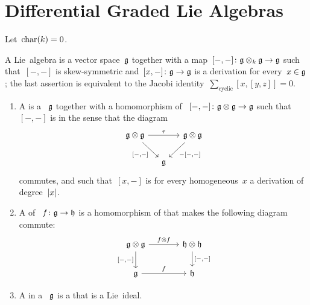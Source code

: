 \documentclass[a4paper,10pt,headings=standardclasses]{scrartcl}
\begin{document}
\section{Differential Graded Lie Algebras}

Let~$\operatorname{char}(k) = 0$.

\begin{recall}
  A Lie~algebra is a vector space~$\mathfrak{g}$ together with a map~$[-,-] \colon \mathfrak{g} \otimes_k \mathfrak{g} \to \mathfrak{g}$ such that~$[-,-]$ is skew-symmetric and~$[x,-] \colon \mathfrak{g} \to \mathfrak{g}$ is a derivation for every~$x \in \mathfrak{g}$;
  the last assertion is equivalent to the Jacobi identity~$\sum_{\text{cyclic}} [x,[y,z]] = 0$.
\end{recall}

\begin{definition}
  \leavevmode
  \begin{enumerate}
    \item
      A  is a {\dgv}~$\mathfrak{g}$ together with a homomorphism of {\dgvs}~$[-,-] \colon \mathfrak{g} \otimes \mathfrak{g} \to \mathfrak{g}$ such that~$[-,-]$ is  in the sense that the diagram
      \[
        \begin{tikzcd}[column sep = small]
          \glie \tensor \glie
          \arrow{rr}[above]{\tau}
          \arrow{dr}[below left]{[-,-]}
          &
          {}
          &
          \glie \tensor \glie
          \arrow{dl}[below right]{-[-,-]}
          \\
          {}
          &
          \glie
          &
          {}
        \end{tikzcd}
      \]
      commutes, and such that~$[x,-]$ is for every homogeneous~$x$ a derivation of degree~$\lvert x\rvert$.
    \item
      A  of {\dgls}~$f \colon \mathfrak{g} \to \mathfrak{h}$ is a homomorphism of {\dgvs} that makes the following diagram commute:
      \[
        \begin{tikzcd}[column sep = large]
          \glie \tensor \glie
          \arrow{r}[above]{f \tensor f}
          \arrow{d}[left]{[-,-]}
          &
          \hlie \tensor \hlie
          \arrow{d}[right]{[-,-]}
          \\
          \glie
          \arrow{r}[above]{f}
          &
          \hlie
        \end{tikzcd}
      \]
    \item
      A {\dgli} in a {\dgl}~$\mathfrak{g}$ is a {\dgsub} that is a Lie~ideal.
  \end{enumerate}
\end{definition}
\end{document}
